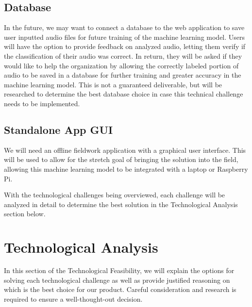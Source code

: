 \documentclass[12pt,journal,compsoc]{IEEEtran}
\newenvironment{subs}
  {\adjustwidth{1em}{0pt}}
  {\endadjustwidth}
\begin{document}
\begin{subs}
\subsection{Database}
In the future, we may want to connect a database to the web application to save user inputted audio files for future training of the machine learning model. Users will have the option to provide feedback on analyzed audio, letting them verify if the classification of their audio was correct. In return, they will be asked if they would like to help the organization by allowing the correctly labeled portion of audio to be saved in a database for further training and greater accuracy in the machine learning model. This is not a guaranteed deliverable, but will be researched to determine the best database choice in case this technical challenge needs to be implemented.

\subsection{Standalone App GUI}
We will need an offline fieldwork application with a graphical user interface. This will be used to allow for the stretch goal of bringing the solution into the field, allowing this machine learning model to be integrated with a laptop or Raspberry Pi.


\skippingparagraph With the technological challenges being overviewed, each challenge will be analyzed in detail to determine the best solution in the Technological Analysis section below.
\end{subs}

\section{Technological Analysis}
In this section of the Technological Feasibility, we will explain the options for solving each technological challenge as well as provide justified reasoning on which is the best choice for our product. Careful consideration and research is required to ensure a well-thought-out decision.
\end{document}
